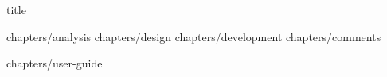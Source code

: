 \documentclass[12pt]{report}
\begin{document}
    {title}

    \tableofcontents

    {chapters/analysis}
    {chapters/design}
    {chapters/development}
    {chapters/comments}

    \begin{appendices}
        {chapters/user-guide}
    \end{appendices}
\end{document}
